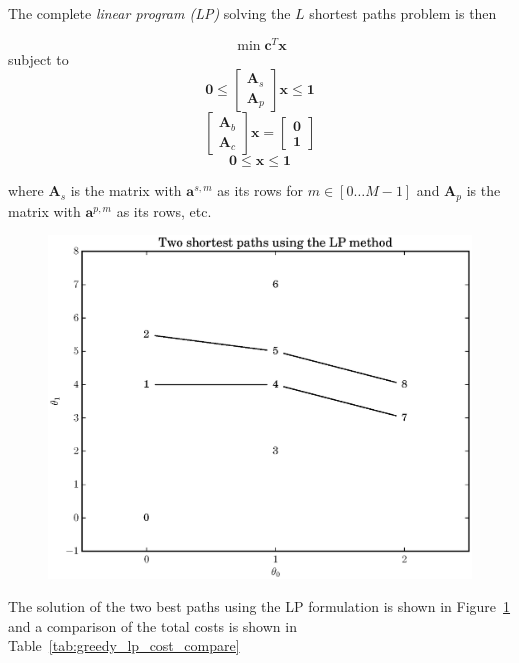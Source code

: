 \documentclass[letterpaper,12pt]{report}
\begin{document}
The complete \textit{linear program (LP)} solving the $L$ shortest paths problem is then
\begin{samepage}
\[
        \min \boldsymbol{c}^{T}\boldsymbol{x}
\]
subject to
\[
    \boldsymbol{0} \leq
    \begin{bmatrix}
        \boldsymbol{A}_{s} \\
        \boldsymbol{A}_{p}
    \end{bmatrix} \boldsymbol{x}
    \leq \boldsymbol{1}
\]
\[
    \begin{bmatrix}
        \boldsymbol{A}_{b} \\
        \boldsymbol{A}_{c}
    \end{bmatrix}
    \boldsymbol{x}
    =
    \begin{bmatrix}
        \boldsymbol{0} \\
        \boldsymbol{1}
    \end{bmatrix}
\]
\[
    \boldsymbol{0} \leq \boldsymbol{x} \leq \boldsymbol{1}
\]
\end{samepage}
where $\boldsymbol{A}_{s}$ is the matrix with $\boldsymbol{a}^{s,m}$ as its rows
for $m \in [0 \dotsc M-1]$ and $\boldsymbol{A}_{p}$ is the matrix with
$\boldsymbol{a}^{p,m}$ as its rows, etc.

\begin{figure}
    \caption{\label{plot:simple_graph_lp_paths}}
    \includegraphics[width=\textwidth]{plots/small_graph_ex_lp_paths.eps}
\end{figure}

The solution of the two best paths using the LP formulation
is shown in Figure~\ref{plot:simple_graph_lp_paths} and a comparison of the
total costs is shown in Table~\ref{tab:greedy_lp_cost_compare}
\end{document}
